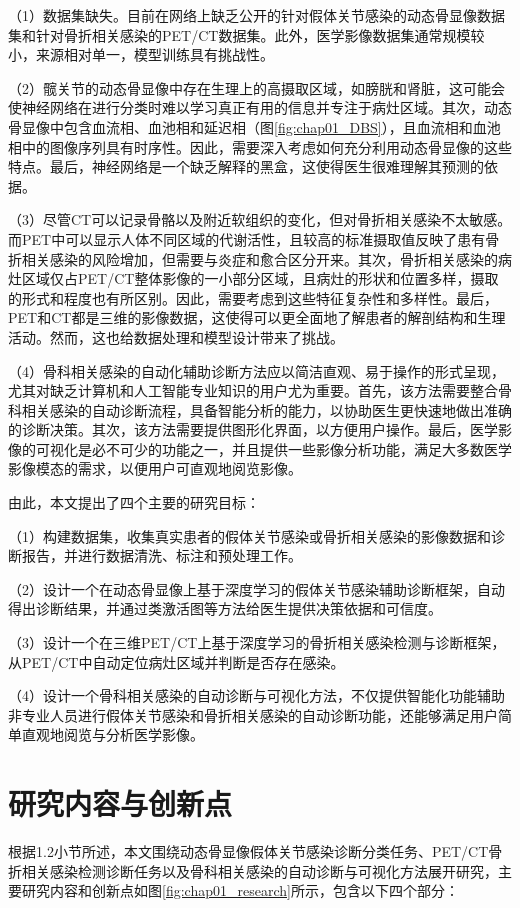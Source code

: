 （1）数据集缺失。目前在网络上缺乏公开的针对假体关节感染的动态骨显像数据集和针对骨折相关感染的PET/CT数据集。此外，医学影像数据集通常规模较小，来源相对单一，模型训练具有挑战性。

（2）髋关节的动态骨显像中存在生理上的高摄取区域，如膀胱和肾脏，这可能会使神经网络在进行分类时难以学习真正有用的信息并专注于病灶区域。其次，动态骨显像中包含血流相、血池相和延迟相（图\ref{fig:chap01_DBS}），且血流相和血池相中的图像序列具有时序性。因此，需要深入考虑如何充分利用动态骨显像的这些特点。最后，神经网络是一个缺乏解释的黑盒，这使得医生很难理解其预测的依据。

（3）尽管CT可以记录骨骼以及附近软组织的变化，但对骨折相关感染不太敏感。而PET中可以显示人体不同区域的代谢活性，且较高的标准摄取值反映了患有骨折相关感染的风险增加，但需要与炎症和愈合区分开来。其次，骨折相关感染的病灶区域仅占PET/CT整体影像的一小部分区域，且病灶的形状和位置多样，摄取的形式和程度也有所区别。因此，需要考虑到这些特征复杂性和多样性。最后，PET和CT都是三维的影像数据，这使得可以更全面地了解患者的解剖结构和生理活动。然而，这也给数据处理和模型设计带来了挑战。

（4）骨科相关感染的自动化辅助诊断方法应以简洁直观、易于操作的形式呈现，尤其对缺乏计算机和人工智能专业知识的用户尤为重要。首先，该方法需要整合骨科相关感染的自动诊断流程，具备智能分析的能力，以协助医生更快速地做出准确的诊断决策。其次，该方法需要提供图形化界面，以方便用户操作。最后，医学影像的可视化是必不可少的功能之一，并且提供一些影像分析功能，满足大多数医学影像模态的需求，以便用户可直观地阅览影像。

由此，本文提出了四个主要的研究目标：

（1）构建数据集，收集真实患者的假体关节感染或骨折相关感染的影像数据和诊断报告，并进行数据清洗、标注和预处理工作。

（2）设计一个在动态骨显像上基于深度学习的假体关节感染辅助诊断框架，自动得出诊断结果，并通过类激活图等方法给医生提供决策依据和可信度。

（3）设计一个在三维PET/CT上基于深度学习的骨折相关感染检测与诊断框架，从PET/CT中自动定位病灶区域并判断是否存在感染。

（4）设计一个骨科相关感染的自动诊断与可视化方法，不仅提供智能化功能辅助非专业人员进行假体关节感染和骨折相关感染的自动诊断功能，还能够满足用户简单直观地阅览与分析医学影像。

\section{研究内容与创新点}

根据1.2小节所述，本文围绕动态骨显像假体关节感染诊断分类任务、PET/CT骨折相关感染检测诊断任务以及骨科相关感染的自动诊断与可视化方法展开研究，主要研究内容和创新点如图\ref{fig:chap01_research}所示，包含以下四个部分：

